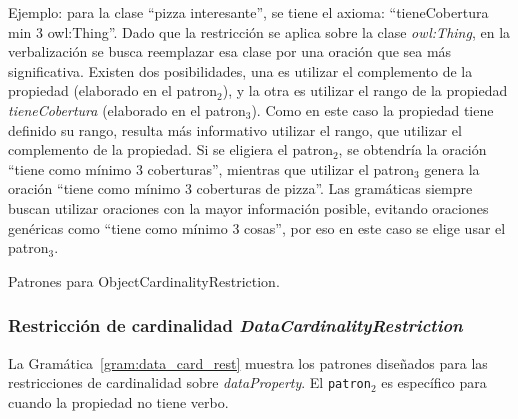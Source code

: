 Ejemplo: para la clase ``pizza interesante'', se tiene el axioma: ``tieneCobertura min 3 owl:Thing''. Dado que la restricción se aplica sobre la clase \emph{owl:Thing}, en la verbalización se busca reemplazar esa clase por una oración que sea más significativa. Existen dos posibilidades, una es utilizar el complemento de la propiedad (elaborado en el patron$_2$), y la otra es utilizar el rango de la propiedad \emph{tieneCobertura} (elaborado en el patron$_3$). Como en este caso la propiedad tiene definido su rango, resulta más informativo utilizar el rango, que utilizar el complemento de la propiedad. Si se eligiera el patron$_2$, se obtendría la oración ``tiene como mínimo 3 coberturas'', mientras que utilizar el patron$_3$ genera la oración ``tiene como mínimo 3 coberturas de pizza''. Las gramáticas siempre buscan utilizar oraciones con la mayor información posible, evitando oraciones genéricas como ``tiene como mínimo 3 cosas'', por eso en este caso se elige usar el patron$_3$.

\begin{GrammarEnv}
\begin{grammar}
\end{grammar}
\caption{Patrones para ObjectCardinalityRestriction.}\label{gram:object_card_rest}
\end{GrammarEnv}

\subsubsection{Restricción de cardinalidad \emph{DataCardinalityRestriction}}
La Gramática~\ref{gram:data_card_rest} muestra los patrones diseñados para las restricciones de cardinalidad sobre \emph{dataProperty}. El {\tt patron$_2$} es específico para cuando la propiedad no tiene verbo. 

